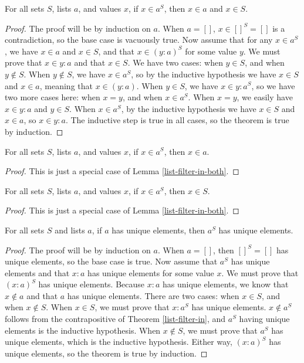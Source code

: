 \documentclass[../math.tex]{subfiles}
\begin{document}
\begin{lemma} \label{list-filter-in-both}
    For all sets $S$, lists $a$, and values $x$, if $x \in a^S$, then $x \in a$
    and $x \in S$.
\end{lemma}
\begin{proof}
    The proof will be by induction on $a$.  When $a = []$, $x \in []^S = []$ is
    a contradiction, so the base case is vacuously true.  Now assume that for
    any $x \in a^S$, we have $x \in a$ and $x \in S$, and that $x \in (y : a)^S$ for some
    value $y$.  We must prove that $x \in y : a$ and that $x \in S$.  We have two cases: when $y
    \in S$, and when $y \notin S$.  When $y \notin S$, we have $x \in a^S$, so
    by the inductive hypothesis we have $x \in S$ and $x \in a$, meaning that $x
    \in (y : a)$.  When $y \in S$, we have $x \in y : a^S$, so we have two more
    cases here: when $x = y$, and when $x \in a^S$.  When $x = y$, we easily
    have $x \in y : a$ and $y \in S$.  When $x \in a^S$, by the inductive
    hypothesis we have $x \in S$ and $x \in a$, so $x \in y : a$.  The inductive
    step is true in all cases, so the theorem is true by induction.
\end{proof}

\begin{theorem} \label{list-filter-in}
    For all sets $S$, lists $a$, and values $x$, if $x \in a^S$, then $x \in a$.
\end{theorem}
\begin{proof}
    This is just a special case of Lemma \ref{list-filter-in-both}.
\end{proof}

\begin{theorem} \label{list-filter-in-set}
    For all sets $S$, lists $a$, and values $x$, if $x \in a^S$, then $x \in S$.
\end{theorem}
\begin{proof}
    This is just a special case of Lemma \ref{list-filter-in-both}.
\end{proof}

\begin{theorem} \label{list-filter-unique}
    For all sets $S$ and lists $a$, if $a$ has unique elements, then $a^S$ has
    unique elements.
\end{theorem}
\begin{proof}
    The proof will be by induction on $a$.  When $a = []$, then $[]^S = []$ has
    unique elements, so the base case is true.  Now assume that $a^S$ has unique
    elements and that $x : a$ has unique elements for some value $x$.  We must
    prove that $(x : a)^S$ has unique elements.  Because $x : a$ has unique
    elements, we know that $x \notin a$ and that $a$ has unique elements.  There
    are two cases: when $x \in S$, and when $x \notin S$.  When $x \in S$, we
    must prove that $x : a^S$ has unique elements.  $x \notin a^S$ follows from
    the contrapositive of Theorem \ref{list-filter-in}, and $a^S$ having unique
    elements is the inductive hypothesis.  When $x \notin S$, we must prove that
    $a^S$ has unique elements, which is the inductive hypothesis.  Either way,
    $(x : a)^S$ has unique elements, so the theorem is true by induction.
\end{proof}
\end{document}
